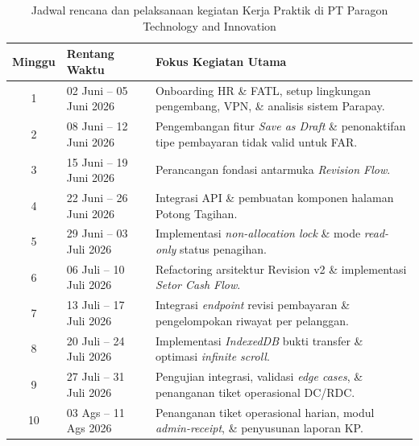 \begin{table}[H]
\caption{Jadwal rencana dan pelaksanaan kegiatan Kerja Praktik di PT Paragon Technology and Innovation}
\label{tab:jadwal-kp}
\centering
\begin{tabularx}{\textwidth}{|c|X|p{4.2cm}|}
\hline
\textbf{Minggu} & \textbf{Rentang Waktu} & \textbf{Fokus Kegiatan Utama} \\
\hline
1 & 02 Juni – 05 Juni 2026 & Onboarding HR \& FATL, setup lingkungan pengembang, VPN, \& analisis sistem Parapay. \\
\hline
2 & 08 Juni – 12 Juni 2026 & Pengembangan fitur \textit{Save as Draft} \& penonaktifan tipe pembayaran tidak valid untuk FAR. \\
\hline
3 & 15 Juni – 19 Juni 2026 & Perancangan fondasi antarmuka \textit{Revision Flow}. \\
\hline
4 & 22 Juni – 26 Juni 2026 & Integrasi API \& pembuatan komponen halaman Potong Tagihan. \\
\hline
5 & 29 Juni – 03 Juli 2026 & Implementasi \textit{non-allocation lock} \& mode \textit{read-only} status penagihan. \\
\hline
6 & 06 Juli – 10 Juli 2026 & Refactoring arsitektur Revision v2 \& implementasi \textit{Setor Cash Flow}. \\
\hline
7 & 13 Juli – 17 Juli 2026 & Integrasi \textit{endpoint} revisi pembayaran \& pengelompokan riwayat per pelanggan. \\
\hline
8 & 20 Juli – 24 Juli 2026 & Implementasi \textit{IndexedDB} bukti transfer \& optimasi \textit{infinite scroll}. \\
\hline
9 & 27 Juli – 31 Juli 2026 & Pengujian integrasi, validasi \textit{edge cases}, \& penanganan tiket operasional DC/RDC. \\
\hline
10 & 03 Ags – 11 Ags 2026 & Penanganan tiket operasional harian, modul \textit{admin-receipt}, \& penyusunan laporan KP. \\
\hline
\end{tabularx}
\end{table}
